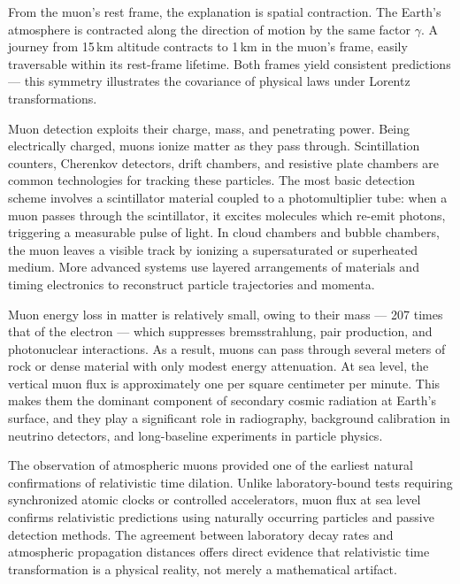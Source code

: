 From the muon’s rest frame, the explanation is spatial contraction. The Earth’s atmosphere is contracted along the direction of motion by the same factor $\gamma$. A journey from 15 km altitude contracts to 1 km in the muon’s frame, easily traversable within its rest-frame lifetime. Both frames yield consistent predictions — this symmetry illustrates the covariance of physical laws under Lorentz transformations.

Muon detection exploits their charge, mass, and penetrating power. Being electrically charged, muons ionize matter as they pass through. Scintillation counters, Cherenkov detectors, drift chambers, and resistive plate chambers are common technologies for tracking these particles. The most basic detection scheme involves a scintillator material coupled to a photomultiplier tube: when a muon passes through the scintillator, it excites molecules which re-emit photons, triggering a measurable pulse of light. In cloud chambers and bubble chambers, the muon leaves a visible track by ionizing a supersaturated or superheated medium. More advanced systems use layered arrangements of materials and timing electronics to reconstruct particle trajectories and momenta.

Muon energy loss in matter is relatively small, owing to their mass — 207 times that of the electron — which suppresses bremsstrahlung, pair production, and photonuclear interactions. As a result, muons can pass through several meters of rock or dense material with only modest energy attenuation. At sea level, the vertical muon flux is approximately one per square centimeter per minute. This makes them the dominant component of secondary cosmic radiation at Earth’s surface, and they play a significant role in radiography, background calibration in neutrino detectors, and long-baseline experiments in particle physics.

The observation of atmospheric muons provided one of the earliest natural confirmations of relativistic time dilation. Unlike laboratory-bound tests requiring synchronized atomic clocks or controlled accelerators, muon flux at sea level confirms relativistic predictions using naturally occurring particles and passive detection methods. The agreement between laboratory decay rates and atmospheric propagation distances offers direct evidence that relativistic time transformation is a physical reality, not merely a mathematical artifact.

\clearpage

